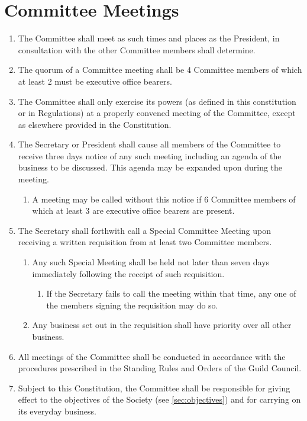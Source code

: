\documentclass[a4paper]{article}
\newenvironment{enumsection}[1]{\section{#1} \begin{enumerate}[ref=\thesection.\theenumi]}{\end{enumerate}}
\begin{document}
\begin{enumsection}{Committee Meetings}
    \item The Committee shall meet as such times and places as the President, in consultation with the other Committee members shall determine.
    \item The quorum of a Committee meeting shall be 4 Committee members of which at least 2 must be executive office bearers.
    \item The Committee shall only exercise its powers (as defined in this constitution or in Regulations) at a properly convened meeting of the Committee, except as elsewhere provided in the Constitution.
    \item The Secretary or President shall cause all members of the Committee to receive three days notice of any such meeting including an agenda of the business to be discussed. This agenda may be expanded upon during the meeting.
    \begin{enumerate}
        \item A meeting may be called without this notice if 6 Committee members of which at least 3 are executive office bearers are present.
    \end{enumerate}
    \item The Secretary shall forthwith call a Special Committee Meeting upon receiving a written requisition from at least two Committee members.
    \begin{enumerate}
        \item Any such Special Meeting shall be held not later than seven days immediately following the receipt of such requisition.
        \begin{enumerate}
            \item If the Secretary fails to call the meeting within that time, any one of the members signing the requisition may do so. 
        \end{enumerate}
        \item Any business set out in the requisition shall have priority over all other business.
    \end{enumerate}
    \item All meetings of the Committee shall be conducted in accordance with the procedures prescribed in the Standing Rules and Orders of the Guild Council.
    \item Subject to this Constitution, the Committee shall be responsible for giving effect to the objectives of the Society (see \cref{sec:objectives}) and for carrying on its everyday business.

\end{enumsection}
\end{document}
